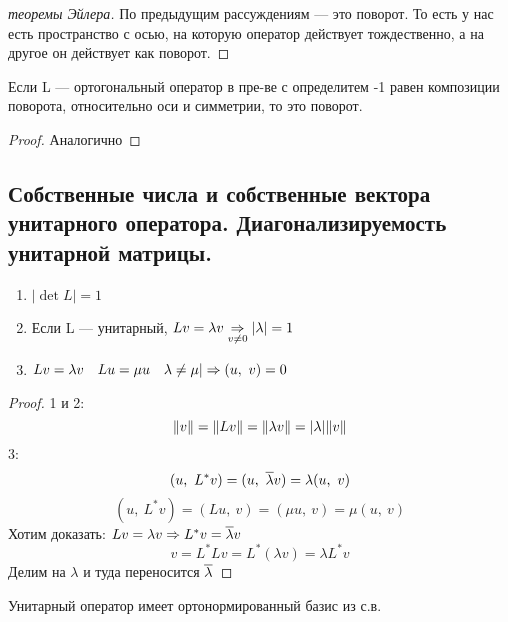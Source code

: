 \documentclass[main]{subfiles}
\begin{document}
\begin{proof}[теоремы Эйлера]
        По предыдущим рассуждениям --- это поворот. То есть у нас есть пространство с осью, на которую оператор действует тождественно, а на другое он действует как поворот.
    \end{proof}

    \begin{utv}
        Если L --- ортогональный оператор в пре-ве с определитем -1 равен композиции поворота, относительно оси и симметрии, то это поворот.
    \end{utv}

    \begin{proof}
        Аналогично
    \end{proof}

    \subsection{Собственные числа и собственные вектора унитарного оператора. Диагонализируемость унитарной матрицы.}

    \begin{utv}
		\begin{enumerate}
			\item $|\det L| = 1$
			\item Если L --- унитарный, $Lv = \lambda v \underset{v \neq 0}{\Rightarrow} |\lambda| = 1$
			\item $Lv = \lambda v \quad Lu = \mu u \quad \lambda \neq \mu | \Rightarrow (u,\ v) = 0$
		\end{enumerate}
	\end{utv}

	\begin{proof}
		1 и 2:
		\[\lVert v \rVert = \lVert Lv \rVert = \lVert \lambda v \rVert = |\lambda| \lVert v \rVert\]
		3:
		\[(u,\ L^* v) = (u,\ \ol{\lambda} v) = \lambda (u,\ v)\]
		\[(u,\ L^* v) = (Lu,\ v) = (\mu u,\ v) = \mu(u,\ v)\]
		Хотим доказать: $Lv = \lambda v \Rightarrow L^* v = \overline{\lambda} v$
		\[v = L^* L v = L^* (\lambda v) = \lambda L^* v\]
		Делим на $\lambda$ и туда переносится $\overline{\lambda}$
	\end{proof}

    \begin{theorem}
        Унитарный оператор имеет ортонормированный базис из с.в.
    \end{theorem}
\end{document}

